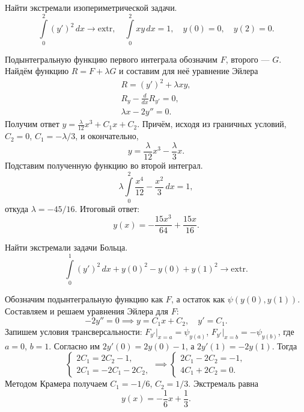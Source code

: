 \begin{problem}
  Найти экстремали изопериметрической задачи.  
  \[
    \int\limits_{0}^{2} (y')^2\,dx \to \mathrm{extr}, \quad
    \int\limits_{0}^{2} xy\,dx = 1, \quad
    y(0) = 0, \quad
    y(2) = 0.
  \]
  
\begin{solution}
  Подынтегральную функцию первого интеграла обозначим $ F $, второго --- $ G $.
  Найдём функцию $ R = F + \lambda G $ и составим для неё уравнение Эйлера
  \begin{gather*}
      R= (y')^2 + \lambda xy,\\
      R_y - \frac{d}{dx} R_{y'} = 0,\\
      \lambda x - 2y'' = 0.
  \end{gather*}
Получим ответ $ y = \frac{\lambda}{12} x^3 + C_1 x + C_2 $. Причём, исходя из
граничных условий, $ C_2 = 0 $, $ C_1 = - \lambda/3 $, и окончательно,  
\[
    y = \frac{\lambda}{12}x^3 - \frac{\lambda}{3} x.
\]
Подставим полученную функцию во второй интеграл.  
\[
  \lambda\int\limits_{0}^{2}\frac{x^4}{12} - \frac{x^2}{3}\,dx = 1,
\]
откуда $ \lambda = -45/16 $. Итоговый ответ: 
\[
    \boxed{
      y(x) = - \frac{15 x^{3}}{64} + \frac{15 x}{16}.
    }
\]

\end{solution}
\end{problem}

\begin{problem}
  Найти экстремали задачи Больца. 
  \[
    \int\limits_{0}^{1} (y')^2\,dx + y(0)^2 - y(0) + y(1)^2 \to \mathrm{extr}.
  \]
\begin{solution}
  Обозначим подынтегральную функцию как $ F $, а остаток как $ \psi(y(0), y(1))
  $. Составляем и решаем уравнения Эйлера для $ F $: 
  \[
      -2y'' = 0 \implies y = C_1x+ C_2, \quad y' = C_1.
  \]
  Запишем условия трансверсальности: $ F_{y'} \big|_{x=a} = \psi_{y(a)} $, $
  F_{y'}\big|_{x=b}= -\psi_{y(b)} $,
 где $ a = 0 $, $ b = 1 $. Согласно им $ 2y'(0) = 2y(0) - 1 $, а $ 2y'(1) =
 -2y(1) $. Тогда  
 \[
     \begin{cases}
       2C_1 = 2C_2 - 1, \\
       2C_1 = -2C_1 - 2C_2,
     \end{cases} \implies
     \begin{cases}
       2C_1 - 2C_2 = -1, \\
       4C_1 + 2C_2 = 0.
     \end{cases}
 \]
Методом Крамера получаем $ C_1 = -1/6 $, $ C_2 = 1/3 $. Экстремаль равна 
\[
    \boxed{
      y(x) = - \frac{1}{6} x + \frac{1}{3}.
    }
\]
\end{solution}
\end{problem}

